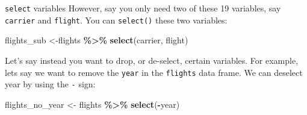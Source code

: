 \documentclass[
  ignorenonframetext,
]{beamer}
\newenvironment{Shaded}{\begin{snugshade}}{\end{snugshade}}
\newcommand{\FunctionTok}[1]{\textcolor[rgb]{0.13,0.29,0.53}{\textbf{#1}}}
\newcommand{\NormalTok}[1]{#1}
\newcommand{\OtherTok}[1]{\textcolor[rgb]{0.56,0.35,0.01}{#1}}
\newcommand{\SpecialCharTok}[1]{\textcolor[rgb]{0.81,0.36,0.00}{\textbf{#1}}}
\begin{document}
\begin{frame}[fragile]{\texttt{select} variables}
\protect\hypertarget{select-variables-1}{}
However, say you only need two of these 19 variables, say
\texttt{carrier} and \texttt{flight}. You can \texttt{select()} these
two variables:

\normalsize

\begin{Shaded}
\begin{Highlighting}[]
\NormalTok{flights\_sub }\OtherTok{\textless{}{-}}\NormalTok{flights }\SpecialCharTok{\%\textgreater{}\%} 
  \FunctionTok{select}\NormalTok{(carrier, flight)}
\end{Highlighting}
\end{Shaded}

\normalsize

Let's say instead you want to drop, or de-select, certain variables. For
example, lets say we want to remove the \texttt{year} in the
\texttt{flights} data frame. We can deselect year by using the
\texttt{-} sign:

\normalsize

\begin{Shaded}
\begin{Highlighting}[]
\NormalTok{flights\_no\_year }\OtherTok{\textless{}{-}}\NormalTok{ flights }\SpecialCharTok{\%\textgreater{}\%} \FunctionTok{select}\NormalTok{(}\SpecialCharTok{{-}}\NormalTok{year)}
\end{Highlighting}
\end{Shaded}

\normalsize
\end{frame}
\end{document}
